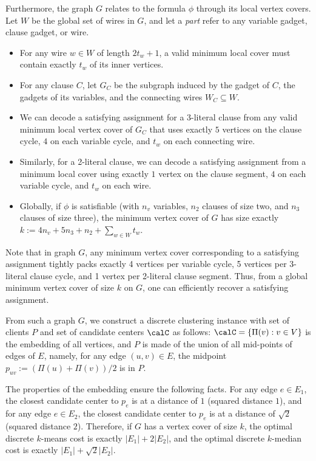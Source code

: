 Furthermore, the graph $G$ relates to the formula $\phi$ through its local vertex covers. Let $W$ be the global set of wires in $G$, and let a \emph{part} refer to any variable gadget, clause gadget, or wire.
\begin{itemize}
    \item For any wire $w \in W$ of length $2t_w + 1$, a valid minimum local cover must contain exactly $t_w$ of its inner vertices. 
    \item For any clause $C$, let $G_C$ be the subgraph induced by the gadget of $C$, the gadgets of its variables, and the connecting wires $W_C \subseteq W$. 
    \item We can decode a satisfying assignment for a 3-literal clause from any valid minimum local vertex cover of $G_C$ that uses exactly $5$ vertices on the clause cycle, $4$ on each variable cycle, and $t_w$ on each connecting wire. 
    \item Similarly, for a 2-literal clause, we can decode a satisfying assignment from a minimum local cover using exactly $1$ vertex on the clause segment, $4$ on each variable cycle, and $t_w$ on each wire. 
    \item Globally, if $\phi$ is satisfiable (with $n_v$ variables, $n_2$ clauses of size two, and $n_3$ clauses of size three), the minimum vertex cover of $G$ has size exactly $k :=  4n_v + 5n_3 + n_2 + \sum_{w \in W} t_w$. 
\end{itemize}
Note that in graph $G$, any minimum vertex cover corresponding to a satisfying assignment tightly packs exactly 4 vertices per variable cycle, 5 vertices per 3-literal clause cycle, and 1 vertex per 2-literal clause segment. Thus, from a global minimum vertex cover of size $k$ on $G$, one can efficiently recover a satisfying assignment.


From such a graph $G$, we construct a discrete clustering instance with set of clients $P$ and set of candidate centers $\calC$ as follows: $\calC = \{\Pi(v): v \in V\}$ is the embedding of all vertices, and 
$P$ is made of the union of all mid-points of edges of $E$, namely, for any edge $(u,v) \in E$, the midpoint $p_{uv} := (\Pi(u) + \Pi(v))/2$ is in $P$. 

The properties of the embedding ensure the following facts. 
For any edge $e \in E_1$, the closest candidate center to $p_e$ is at a distance of $1$ (squared distance $1$), and for any edge $e \in E_2$, the closest candidate center to $p_e$ is at a distance of $\sqrt{2}$ (squared distance $2$). Therefore, if $G$ has a vertex cover of size $k$, the optimal discrete $k$-means cost is exactly $|E_1| + 2|E_2|$, and the optimal discrete $k$-median cost is exactly $|E_1| + \sqrt{2}|E_2|$.

